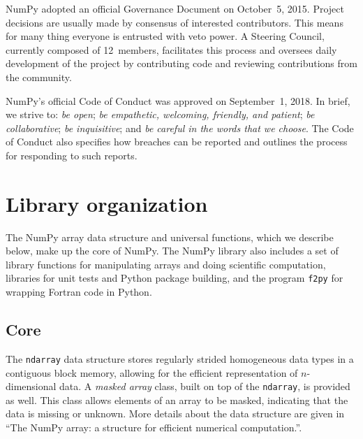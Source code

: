 \documentclass[fleqn,10pt]{wlscirep}
\newcommand{\code}[1]{\texttt{#1}}
\begin{document}
NumPy adopted an official Governance Document on October~5,
2015\cite{NumPyProjectGovernance}.
Project decisions are usually made by consensus of interested contributors.
This means for many thing everyone is entrusted with veto power.
A Steering Council, currently composed of 12~members, facilitates this
process and oversees daily development of the project by contributing code
and reviewing contributions from the community.

NumPy's official Code of Conduct was approved on September~1, 2018\cite{NumPyCodeofConduct}.
In brief, we strive to:
\emph{be open};
\emph{be empathetic, welcoming, friendly, and patient};
\emph{be collaborative};
\emph{be inquisitive}; and
\emph{be careful in the words that we choose}.
The Code of Conduct also specifies how breaches can be reported and outlines
the process for responding to such reports.



\section*{Library organization}

The NumPy array data structure and universal functions, which we describe
below, make up the core of NumPy.
The NumPy library also includes
a set of library functions for manipulating arrays and doing scientific computation,
libraries for unit tests and Python package building,
and the program \code{f2py}\cite{peterson2009f2py} for wrapping Fortran code in Python.

\subsection*{Core}

The \code{ndarray} data structure stores regularly strided homogeneous data
types in a contiguous block memory, allowing for the efficient representation
of $n$-dimensional data.
A \emph{masked array} class, built on top of the \code{ndarray}, is
provided as well. This class allows elements of an array to be masked,
indicating that the data is missing or unknown.
More details about the data structure are given in ``The NumPy array:
a structure for efficient numerical computation.''\cite{vanderwalt2011numpy}.
\end{document}

